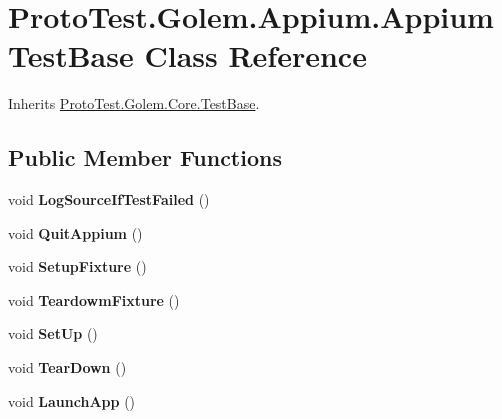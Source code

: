 \hypertarget{class_proto_test_1_1_golem_1_1_appium_1_1_appium_test_base}{\section{Proto\-Test.\-Golem.\-Appium.\-Appium\-Test\-Base Class Reference}
\label{class_proto_test_1_1_golem_1_1_appium_1_1_appium_test_base}
}


Inherits \hyperlink{class_proto_test_1_1_golem_1_1_core_1_1_test_base}{Proto\-Test.\-Golem.\-Core.\-Test\-Base}.

\subsection*{Public Member Functions}
\begin{DoxyCompactItemize}
\item 
\hypertarget{class_proto_test_1_1_golem_1_1_appium_1_1_appium_test_base_a1cbd2525a5b9785feab7be87e789da9d}{void {\bfseries Log\-Source\-If\-Test\-Failed} ()}\label{class_proto_test_1_1_golem_1_1_appium_1_1_appium_test_base_a1cbd2525a5b9785feab7be87e789da9d}

\item 
\hypertarget{class_proto_test_1_1_golem_1_1_appium_1_1_appium_test_base_a93951d98db72b9a2831a76aa9d740753}{void {\bfseries Quit\-Appium} ()}\label{class_proto_test_1_1_golem_1_1_appium_1_1_appium_test_base_a93951d98db72b9a2831a76aa9d740753}

\item 
\hypertarget{class_proto_test_1_1_golem_1_1_appium_1_1_appium_test_base_afc44a5df3c0c1b76057ad8b807c68290}{void {\bfseries Setup\-Fixture} ()}\label{class_proto_test_1_1_golem_1_1_appium_1_1_appium_test_base_afc44a5df3c0c1b76057ad8b807c68290}

\item 
\hypertarget{class_proto_test_1_1_golem_1_1_appium_1_1_appium_test_base_a3c9af1ec44f00fb8f90efd7d98145351}{void {\bfseries Teardowm\-Fixture} ()}\label{class_proto_test_1_1_golem_1_1_appium_1_1_appium_test_base_a3c9af1ec44f00fb8f90efd7d98145351}

\item 
\hypertarget{class_proto_test_1_1_golem_1_1_appium_1_1_appium_test_base_a7597f72fb52971fae949e5accf649f12}{void {\bfseries Set\-Up} ()}\label{class_proto_test_1_1_golem_1_1_appium_1_1_appium_test_base_a7597f72fb52971fae949e5accf649f12}

\item 
\hypertarget{class_proto_test_1_1_golem_1_1_appium_1_1_appium_test_base_ae8bce9bce76e54f2f7f89576fefdb76e}{void {\bfseries Tear\-Down} ()}\label{class_proto_test_1_1_golem_1_1_appium_1_1_appium_test_base_ae8bce9bce76e54f2f7f89576fefdb76e}

\item 
\hypertarget{class_proto_test_1_1_golem_1_1_appium_1_1_appium_test_base_a4999f4bc41c7ed43882729940fc1c0c4}{void {\bfseries Launch\-App} ()}\label{class_proto_test_1_1_golem_1_1_appium_1_1_appium_test_base_a4999f4bc41c7ed43882729940fc1c0c4}

\end{DoxyCompactItemize}
